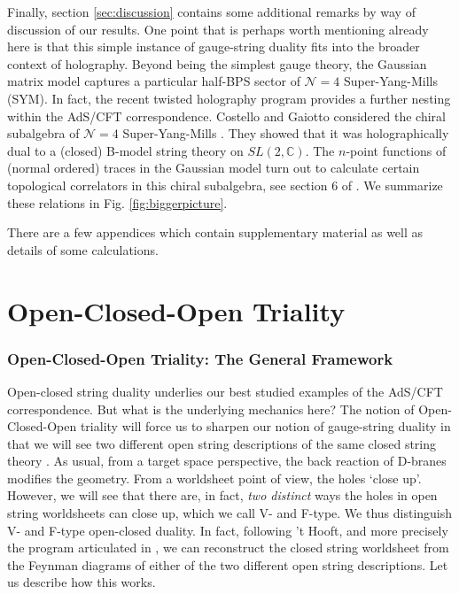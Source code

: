 \documentclass[english]{article}
\let\mc=\mathcal
\begin{document}
Finally, section \ref{sec:discussion} contains some additional remarks by way of discussion of our results. One point that is perhaps worth mentioning already here is that this simple instance of gauge-string duality fits into the broader context of holography. Beyond being the simplest gauge theory, the Gaussian matrix model captures a particular half-BPS sector of $\mc{N}=4$ Super-Yang-Mills (SYM). In fact, the recent twisted holography program \cite{CostelloGaiottoTH,Costello:2020jbh} provides a further nesting within the AdS/CFT correspondence. Costello and Gaiotto considered the chiral subalgebra of $\mc{N}=4$ Super-Yang-Mills \cite{beemRastelli2015,bonettiRastelli2018}. They showed that it was holographically dual to a (closed) B-model string theory on $SL(2,\mathbb{C})$. The $n$-point functions of (normal ordered) traces in the Gaussian model turn out to calculate certain topological correlators in this chiral subalgebra, see section 6 of \cite{Budzik:2021fyh}. We summarize these relations in Fig. \ref{fig:biggerpicture}.

There are a few appendices which contain supplementary material as well as details of some calculations.


\pagebreak


\part{Open-Closed-Open Triality }



\section{Open-Closed-Open Triality: The General Framework}

Open-closed string duality underlies our best studied examples of the AdS/CFT correspondence. But what is the underlying mechanics here? The notion of Open-Closed-Open triality  will force us to sharpen our notion of gauge-string duality in that we will see two different open string descriptions of the same closed string theory \cite{Joburg}. As usual, from a target space perspective, the back reaction of D-branes modifies the geometry. From a worldsheet point of view, the holes `close up'. However, we will see that there are, in fact, {\it two distinct} ways the holes in open string worldsheets can close up, which we call V- and F-type. We thus distinguish V- and F-type open-closed duality. In fact, following 't Hooft, and more precisely the program articulated in \cite{freefieldsadsI,freefieldsadsII,freefieldsIII}, we can reconstruct the closed string worldsheet from the Feynman diagrams of either of the two different open string descriptions. Let us describe how this works. 
\end{document}
